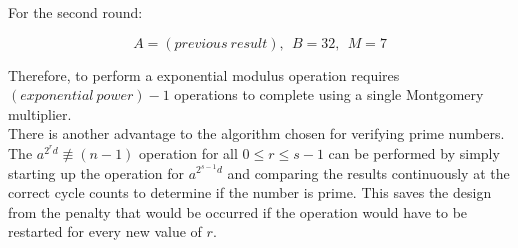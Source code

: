 \documentclass[journal]{IEEEtran}
\begin{document}
For the second round:

\begin{displaymath}
	A = (previous\ result),\ \ B=32,\ \ M=7
\end{displaymath}

Therefore, to perform a exponential modulus operation requires $(exponential\ power) - 1$ operations to complete using a single Montgomery multiplier. \\

There is another advantage to the algorithm chosen for verifying prime numbers.
The $a^{2^rd} \not \equiv (n-1)$ operation for all $0 \le r \le s-1$ can be performed by simply starting up the operation for $a^{2^{s-1}d}$ and comparing the results continuously at the correct cycle counts to determine if the number is prime. This saves the design from the penalty that would be occurred if the operation would have to be restarted for every new value of $r$. 





%
%

\end{document}

